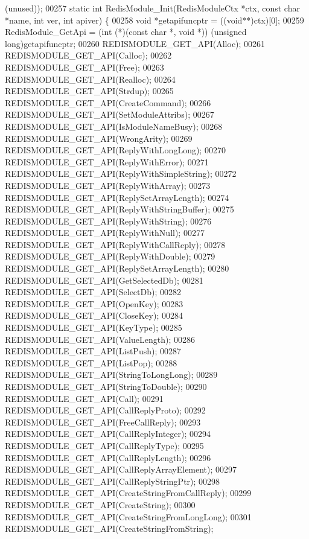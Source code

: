 \begin{DoxyCode}
      (unused));
00257 \textcolor{keyword}{static} \textcolor{keywordtype}{int} RedisModule\_Init(RedisModuleCtx *ctx, \textcolor{keyword}{const} \textcolor{keywordtype}{char} *name, \textcolor{keywordtype}{int} ver, \textcolor{keywordtype}{int} apiver) \{
00258     \textcolor{keywordtype}{void} *getapifuncptr = ((\textcolor{keywordtype}{void}**)ctx)[0];
00259     RedisModule\_GetApi = (\textcolor{keywordtype}{int} (*)(\textcolor{keyword}{const} \textcolor{keywordtype}{char} *, \textcolor{keywordtype}{void} *)) (\textcolor{keywordtype}{unsigned} \textcolor{keywordtype}{long})getapifuncptr;
00260     REDISMODULE\_GET\_API(Alloc);
00261     REDISMODULE\_GET\_API(Calloc);
00262     REDISMODULE\_GET\_API(Free);
00263     REDISMODULE\_GET\_API(Realloc);
00264     REDISMODULE\_GET\_API(Strdup);
00265     REDISMODULE\_GET\_API(CreateCommand);
00266     REDISMODULE\_GET\_API(SetModuleAttribs);
00267     REDISMODULE\_GET\_API(IsModuleNameBusy);
00268     REDISMODULE\_GET\_API(WrongArity);
00269     REDISMODULE\_GET\_API(ReplyWithLongLong);
00270     REDISMODULE\_GET\_API(ReplyWithError);
00271     REDISMODULE\_GET\_API(ReplyWithSimpleString);
00272     REDISMODULE\_GET\_API(ReplyWithArray);
00273     REDISMODULE\_GET\_API(ReplySetArrayLength);
00274     REDISMODULE\_GET\_API(ReplyWithStringBuffer);
00275     REDISMODULE\_GET\_API(ReplyWithString);
00276     REDISMODULE\_GET\_API(ReplyWithNull);
00277     REDISMODULE\_GET\_API(ReplyWithCallReply);
00278     REDISMODULE\_GET\_API(ReplyWithDouble);
00279     REDISMODULE\_GET\_API(ReplySetArrayLength);
00280     REDISMODULE\_GET\_API(GetSelectedDb);
00281     REDISMODULE\_GET\_API(SelectDb);
00282     REDISMODULE\_GET\_API(OpenKey);
00283     REDISMODULE\_GET\_API(CloseKey);
00284     REDISMODULE\_GET\_API(KeyType);
00285     REDISMODULE\_GET\_API(ValueLength);
00286     REDISMODULE\_GET\_API(ListPush);
00287     REDISMODULE\_GET\_API(ListPop);
00288     REDISMODULE\_GET\_API(StringToLongLong);
00289     REDISMODULE\_GET\_API(StringToDouble);
00290     REDISMODULE\_GET\_API(Call);
00291     REDISMODULE\_GET\_API(CallReplyProto);
00292     REDISMODULE\_GET\_API(FreeCallReply);
00293     REDISMODULE\_GET\_API(CallReplyInteger);
00294     REDISMODULE\_GET\_API(CallReplyType);
00295     REDISMODULE\_GET\_API(CallReplyLength);
00296     REDISMODULE\_GET\_API(CallReplyArrayElement);
00297     REDISMODULE\_GET\_API(CallReplyStringPtr);
00298     REDISMODULE\_GET\_API(CreateStringFromCallReply);
00299     REDISMODULE\_GET\_API(CreateString);
00300     REDISMODULE\_GET\_API(CreateStringFromLongLong);
00301     REDISMODULE\_GET\_API(CreateStringFromString);

\end{DoxyCode}
